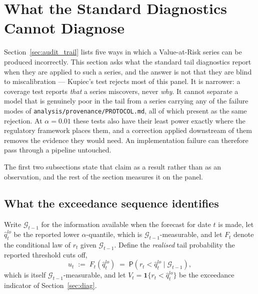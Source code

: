 \documentclass[preprint,11pt,authoryear]{elsarticle}
\renewcommand{\P}{\mathsf{P}}
\newcommand{\1}{\boldsymbol{1}}
\begin{document}
\section{What the Standard Diagnostics Cannot Diagnose}
\label{sec:blindspot}

Section~\ref{sec:audit_trail} lists five ways in which a Value-at-Risk series can
be produced incorrectly. This section asks what the standard tail diagnostics
report when they are applied to such a series, and the answer is not that they
are blind to miscalibration --- Kupiec's test rejects most of this panel. It is
narrower: a coverage test reports \emph{that} a series miscovers, never
\emph{why}. It cannot separate a model that is genuinely poor in the tail from a
series carrying any of the failure modes of \texttt{analysis/provenance/PROTOCOL.md}, all of
which present as the same rejection. At $\alpha = 0.01$ these tests also have
their least power exactly where the regulatory framework places them, and a
correction applied downstream of them removes the evidence they would need. An
implementation failure can therefore pass through a pipeline untouched.

The first two subsections state that claim as a result rather than as an
observation, and the rest of the section measures it on the panel.

\subsection{What the exceedance sequence identifies}
\label{sec:blindspot_identification}

Write $\mathcal G_{t-1}$ for the information available when the forecast for date
$t$ is made, let $\hat q^{lo}_t$ be the reported lower $\alpha$-quantile, which is
$\mathcal G_{t-1}$-measurable, and let $F_t$ denote the conditional law of $r_t$
given $\mathcal G_{t-1}$. Define the \emph{realised} tail probability the reported
threshold cuts off,
\begin{equation}
	\label{eq:u_process}
	u_t \;:=\; F_t\!\left(\hat q^{lo}_t\right)
	\;=\; \P\!\left(r_t < \hat q^{lo}_t \mid \mathcal G_{t-1}\right),
\end{equation}
which is itself $\mathcal G_{t-1}$-measurable, and let
$V_t = \mathbf 1\{r_t < \hat q^{lo}_t\}$ be the exceedance indicator of
Section~\ref{sec:diag}.
\end{document}
